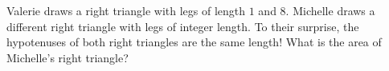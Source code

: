 Valerie draws a right triangle with legs of length $1$ and $8$. Michelle draws a different right triangle with legs of integer length. To their surprise, the hypotenuses of both right triangles are the same length! What is the area of Michelle's right triangle?
